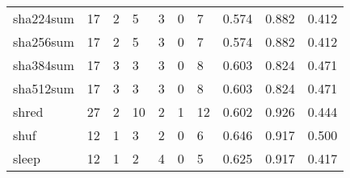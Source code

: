 \begin{longtable}{lp{1.3cm}p{1.3cm}p{1.3cm}p{1.3cm}p{1.3cm}p{1.3cm}p{1.3cm}p{1.3cm}p{1.3cm}}
sha224sum &                     17 &                                             2 &                                            5 &                                           3 &                                            0 &                                          7 &                                0.574 &                                  0.882 &                                0.412 \\
sha256sum &                     17 &                                             2 &                                            5 &                                           3 &                                            0 &                                          7 &                                0.574 &                                  0.882 &                                0.412 \\
sha384sum &                     17 &                                             3 &                                            3 &                                           3 &                                            0 &                                          8 &                                0.603 &                                  0.824 &                                0.471 \\
sha512sum &                     17 &                                             3 &                                            3 &                                           3 &                                            0 &                                          8 &                                0.603 &                                  0.824 &                                0.471 \\
shred     &                     27 &                                             2 &                                           10 &                                           2 &                                            1 &                                         12 &                                0.602 &                                  0.926 &                                0.444 \\
shuf      &                     12 &                                             1 &                                            3 &                                           2 &                                            0 &                                          6 &                                0.646 &                                  0.917 &                                0.500 \\
sleep     &                     12 &                                             1 &                                            2 &                                           4 &                                            0 &                                          5 &                                0.625 &                                  0.917 &                                0.417 \\

\end{longtable}
